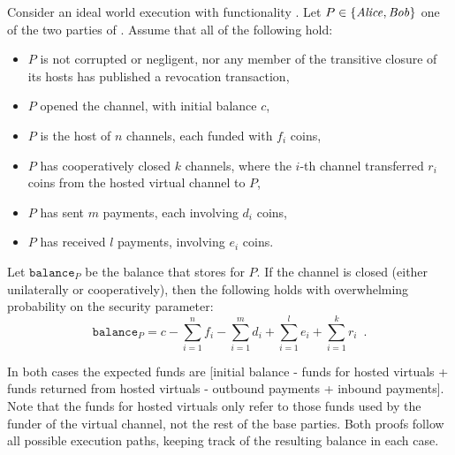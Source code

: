 \begin{lemma}
\label{lemma:ideal-balance-informal}
  Consider an ideal world execution with functionality \fchan. Let $P \in
  \{\mathit{Alice}, \mathit{Bob}\}$ one of the two parties of \fchan.
  Assume that all of the following hold:
  \begin{itemize}
    \item $P$ is not corrupted or negligent, nor any member of the
    transitive closure of its hosts has published a revocation transaction,
    \item $P$ opened the channel, with initial balance $c$,
    \item $P$ is the host of $n$ channels, each funded with $f_i$ coins,
    \item $P$ has cooperatively closed $k$ channels, where the $i$-th channel
    transferred $r_i$ coins from the hosted virtual channel to $P$,
    \item $P$ has sent $m$ payments, each involving $d_i$ coins,
    \item $P$ has received $l$ payments, involving $e_i$ coins.
  \end{itemize}
  Let $\texttt{balance}_P$ be the balance that \fchan stores for $P$.
  If the channel is closed (either unilaterally or cooperatively), then the
  following holds with overwhelming probability on the security parameter:
  \begin{equation}
    \texttt{balance}_P = c - \sum\limits_{i=1}^n f_i - \sum\limits_{i=1}^m d_i +
    \sum\limits_{i=1}^l e_i + \sum\limits_{i=1}^k r_i \enspace.
  \end{equation}
\end{lemma}

  In both cases the expected funds are [initial balance - funds for hosted
  virtuals + funds returned from hosted virtuals - outbound payments + inbound
  payments]. Note that the funds for hosted virtuals only refer to those funds
  used by the funder of the virtual channel, not the rest of the base parties.
  Both proofs follow all possible execution paths, keeping track of the
  resulting balance in each case.



